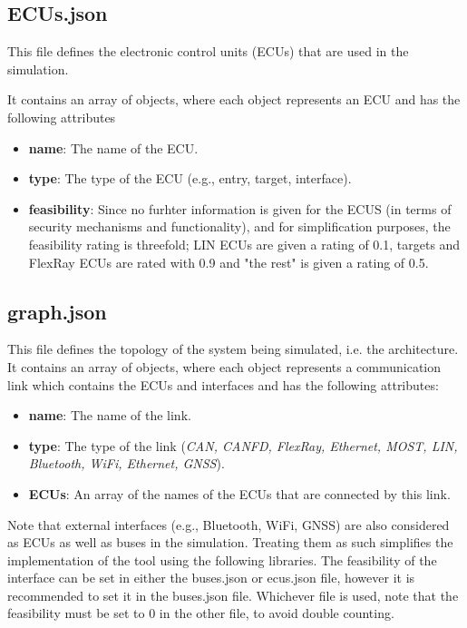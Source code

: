 \subsection{ECUs.json}
\label{sec:ECUs}

This file defines the electronic control units (ECUs) that are used in the simulation. 

It contains an array of objects, where each object represents an ECU and has the following attributes

\begin{itemize}
\item \textbf{name}: The name of the ECU.
\item \textbf{type}: The type of the ECU (e.g., entry, target, interface).
\item \textbf{feasibility}: Since no furhter information is given for the ECUS (in terms of security mechanisms and functionality),
and for simplification purposes, the feasibility rating is threefold; 
LIN ECUs are given a rating of 0.1, targets and FlexRay ECUs are rated with 0.9 and "the rest" is given a rating of 0.5.
\end{itemize}

\subsection{graph.json}
\label{sec:graph}

This file defines the topology of the system being simulated, i.e. the architecture. 
It contains an array of objects, where each object represents a communication link which contains the ECUs and interfaces and has the following attributes:

\begin{itemize}
\item \textbf{name}: The name of the link.
\item \textbf{type}: The type of the link (\textit{CAN, CANFD, FlexRay, Ethernet, MOST, LIN, Bluetooth, WiFi, Ethernet, GNSS}).
\item \textbf{ECUs}: An array of the names of the ECUs that are connected by this link.
\end{itemize}

Note that external interfaces (e.g., Bluetooth, WiFi, GNSS) are also considered as ECUs as well as buses in the simulation.
Treating them as such simplifies the implementation of the tool using the following libraries.
The feasibility of the interface can be set in either the buses.json or ecus.json file, however it is recommended to set it in the buses.json file.
Whichever file is used, note that the feasibility must be set to 0 in the other file, to avoid double counting.


